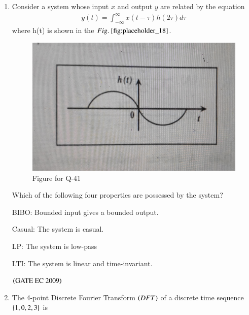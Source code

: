\documentclass[journal,12pt,onecolumn]{IEEEtran}
\theoremstyle{remark}
\begin{document}
\begin{enumerate}
\item Consider a system whose input $x$ and output $y$ are related by the equation 
\begin{align*}
    y(t)= \int_{-\infty}^{\infty} x(t-\tau)h(2\tau)d\tau
\end{align*}
where h(t) is shown in the $\figref{fig:placeholder_18}$.
\begin{figure}[H]
    \centering
    \includegraphics[width=0.5\columnwidth]{figs/fig_18.jpg}
    \caption{\centering Figure for Q-41}
    \label{fig:placeholder_18}
\end{figure}

Which of the following four properties are possessed by the system?

BIBO: Bounded input gives a bounded output.

Casual: The system is casual.

LP: The system is low-pass

LTI: The system is linear and time-invariant.
\begin{enumerate}
\end{enumerate}
\hfill $\brak{\text{GATE EC 2009}}$

\item The 4-point Discrete Fourier Transform $\brak{DFT}$ of a discrete time sequence $\cbrak{1,0,2,3}$ is 
\begin{enumerate}
\end{enumerate}
\end{enumerate}
\end{document}

